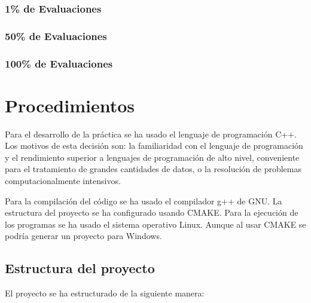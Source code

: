 \documentclass[a4paper, 12.5pt]{report}
\begin{document}
    \subsubsection{1\% de Evaluaciones}

    \subsubsection{50\% de Evaluaciones}

    \subsubsection{100\% de Evaluaciones}


    \section{Procedimientos}

    Para el desarrollo de la práctica se ha usado el lenguaje de programación C++. Los motivos de esta decisión son: la familiaridad con el lenguaje de programación y el rendimiento superior a lenguajes de programación de alto nivel, conveniente para el tratamiento de grandes cantidades de datos, o la resolución de problemas computacionalmente intensivos.

    Para la compilación del código se ha usado el compilador g++ de GNU. La estructura del proyecto se ha configurado usando CMAKE. Para la ejecución de los programas se ha usado el sistema operativo Linux. Aunque al usar CMAKE se podría generar un proyecto para Windows.

    \newpage

    \subsection{Estructura del proyecto}

    El proyecto se ha estructurado de la siguiente manera:
\end{document}
